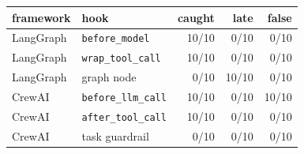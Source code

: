 \begin{tabular}{llrrr}
\toprule
framework & hook & caught & late & false \\
\midrule
LangGraph & \texttt{before\_model} & 10/10 & 0/10 & 0/10 \\
LangGraph & \texttt{wrap\_tool\_call} & 10/10 & 0/10 & 0/10 \\
LangGraph & graph node & 0/10 & 10/10 & 0/10 \\
CrewAI & \texttt{before\_llm\_call} & 10/10 & 0/10 & 10/10 \\
CrewAI & \texttt{after\_tool\_call} & 10/10 & 0/10 & 0/10 \\
CrewAI & task guardrail & 0/10 & 0/10 & 0/10 \\
\bottomrule
\end{tabular}
